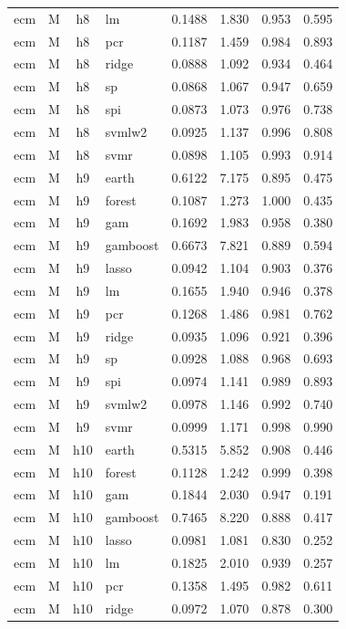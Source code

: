 \begin{ThreePartTable}
\begin{longtable}[t]{llclcccc}
ecm & M & h8 & lm & 0.1488 & 1.830 & 0.953 & 0.595\\
ecm & M & h8 & pcr & 0.1187 & 1.459 & 0.984 & 0.893\\
ecm & M & h8 & ridge & 0.0888 & 1.092 & 0.934 & 0.464\\
ecm & M & h8 & sp & 0.0868 & 1.067 & 0.947 & 0.659\\
ecm & M & h8 & spi & 0.0873 & 1.073 & 0.976 & 0.738\\
ecm & M & h8 & svmlw2 & 0.0925 & 1.137 & 0.996 & 0.808\\
ecm & M & h8 & svmr & 0.0898 & 1.105 & 0.993 & 0.914\\
\addlinespace
ecm & M & h9 & earth & 0.6122 & 7.175 & 0.895 & 0.475\\
ecm & M & h9 & forest & 0.1087 & 1.273 & 1.000 & 0.435\\
ecm & M & h9 & gam & 0.1692 & 1.983 & 0.958 & 0.380\\
ecm & M & h9 & gamboost & 0.6673 & 7.821 & 0.889 & 0.594\\
ecm & M & h9 & lasso & 0.0942 & 1.104 & 0.903 & 0.376\\
ecm & M & h9 & lm & 0.1655 & 1.940 & 0.946 & 0.378\\
ecm & M & h9 & pcr & 0.1268 & 1.486 & 0.981 & 0.762\\
ecm & M & h9 & ridge & 0.0935 & 1.096 & 0.921 & 0.396\\
ecm & M & h9 & sp & 0.0928 & 1.088 & 0.968 & 0.693\\
ecm & M & h9 & spi & 0.0974 & 1.141 & 0.989 & 0.893\\
ecm & M & h9 & svmlw2 & 0.0978 & 1.146 & 0.992 & 0.740\\
ecm & M & h9 & svmr & 0.0999 & 1.171 & 0.998 & 0.990\\
\addlinespace
ecm & M & h10 & earth & 0.5315 & 5.852 & 0.908 & 0.446\\
ecm & M & h10 & forest & 0.1128 & 1.242 & 0.999 & 0.398\\
ecm & M & h10 & gam & 0.1844 & 2.030 & 0.947 & 0.191\\
ecm & M & h10 & gamboost & 0.7465 & 8.220 & 0.888 & 0.417\\
ecm & M & h10 & lasso & 0.0981 & 1.081 & 0.830 & 0.252\\
ecm & M & h10 & lm & 0.1825 & 2.010 & 0.939 & 0.257\\
ecm & M & h10 & pcr & 0.1358 & 1.495 & 0.982 & 0.611\\
ecm & M & h10 & ridge & 0.0972 & 1.070 & 0.878 & 0.300\\

\end{longtable}
\end{ThreePartTable}
